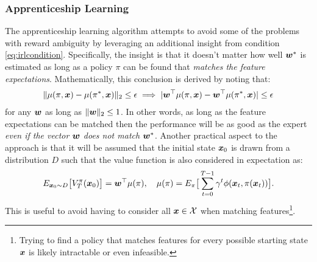 \subsubsection{Apprenticeship Learning}
The apprenticeship learning\cite{AbbeelNg2004} algorithm attempts to avoid some of the problems with reward ambiguity by leveraging an additional insight from condition \eqref{eq:irlcondition}. Specifically, the insight is that it doesn't matter how well $\bm{w}^*$ is estimated as long as a policy $\pi$ can be found that \textit{matches the feature expectations}. Mathematically, this conclusion is derived by noting that:
\begin{equation*}
\begin{split}
\lVert \mu(\pi, \bm{x}) - \mu(\pi^*, \bm{x}) \rVert_2 \leq \epsilon \implies \lvert \bm{w}^\top  \mu(\pi, \bm{x}) - \bm{w}^\top  \mu(\pi^*, \bm{x}) \rvert \leq \epsilon
\end{split}
\end{equation*}
for any $\bm{w}$ as long as $\lVert \bm{w} \rVert_2 \leq 1$. In other words, as long as the feature expectations can be matched then the performance will be as good as the expert \textit{even if the vector $\bm{w}$ does not match $\bm{w}^*$}. Another practical aspect to the approach is that it will be assumed that the initial state $\bm{x}_0$ is drawn from a distribution $D$ such that the value function is also considered in expectation as:
\begin{equation*}
E_{\bm{x}_0 \sim D}\big[ V_T^\pi(\bm{x}_0) \big] = \bm{w}^\top  \mu(\pi), \quad \mu(\pi) = E_{\pi}\big[\sum_{t=0}^{T-1} \gamma^t \phi(\bm{x}_t, \pi(\bm{x}_t)) \big].    
\end{equation*}
This is useful to avoid having to consider all $\bm{x} \in \mathcal{X}$ when matching features\footnote{Trying to find a policy that matches features for every possible starting state $\bm{x}$ is likely intractable or even infeasible.}.

